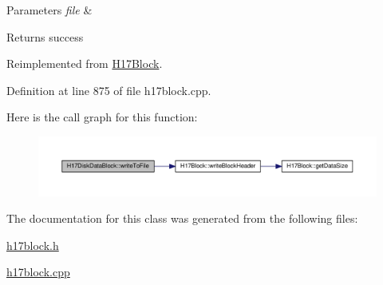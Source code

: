 \begin{DoxyParams}{Parameters}
{\em file} & \\
\hline
\end{DoxyParams}
\begin{DoxyReturn}{Returns}
success 
\end{DoxyReturn}


Reimplemented from \hyperlink{classH17Block_a59901675cd140c907fb6de4c8e0452d5}{H17\+Block}.



Definition at line 875 of file h17block.\+cpp.



Here is the call graph for this function\+:\nopagebreak
\begin{figure}[H]
\begin{center}
\leavevmode
\includegraphics[width=350pt]{classH17DiskDataBlock_a6d7181e767bbc590cfee7c589c56930a_cgraph}
\end{center}
\end{figure}




The documentation for this class was generated from the following files\+:\begin{DoxyCompactItemize}
\item 
\hyperlink{h17block_8h}{h17block.\+h}\item 
\hyperlink{h17block_8cpp}{h17block.\+cpp}\end{DoxyCompactItemize}
